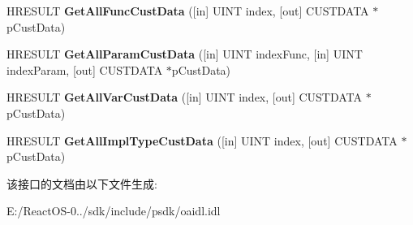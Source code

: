 \begin{DoxyCompactItemize}
\mbox{\label{interface_i_type_info2_a973b8ef8748d6a0908bf2b24c20a2db8}} 
H\+R\+E\+S\+U\+LT {\bfseries Get\+All\+Func\+Cust\+Data} (\mbox{[}in\mbox{]} U\+I\+NT index, \mbox{[}out\mbox{]} C\+U\+S\+T\+D\+A\+TA $\ast$p\+Cust\+Data)
\item 
\mbox{\label{interface_i_type_info2_abcc7b2484231adc3f509ee97b5f974b4}} 
H\+R\+E\+S\+U\+LT {\bfseries Get\+All\+Param\+Cust\+Data} (\mbox{[}in\mbox{]} U\+I\+NT index\+Func, \mbox{[}in\mbox{]} U\+I\+NT index\+Param, \mbox{[}out\mbox{]} C\+U\+S\+T\+D\+A\+TA $\ast$p\+Cust\+Data)
\item 
\mbox{\label{interface_i_type_info2_a24fa7e37aa42a0fc51123a1d9ac9909a}} 
H\+R\+E\+S\+U\+LT {\bfseries Get\+All\+Var\+Cust\+Data} (\mbox{[}in\mbox{]} U\+I\+NT index, \mbox{[}out\mbox{]} C\+U\+S\+T\+D\+A\+TA $\ast$p\+Cust\+Data)
\item 
\mbox{\label{interface_i_type_info2_afd7153c80e4ab4e28be598020f7872c2}} 
H\+R\+E\+S\+U\+LT {\bfseries Get\+All\+Impl\+Type\+Cust\+Data} (\mbox{[}in\mbox{]} U\+I\+NT index, \mbox{[}out\mbox{]} C\+U\+S\+T\+D\+A\+TA $\ast$p\+Cust\+Data)
\end{DoxyCompactItemize}


该接口的文档由以下文件生成\+:\begin{DoxyCompactItemize}
\item 
E\+:/\+React\+O\+S-\/0../sdk/include/psdk/oaidl.\+idl\end{DoxyCompactItemize}
